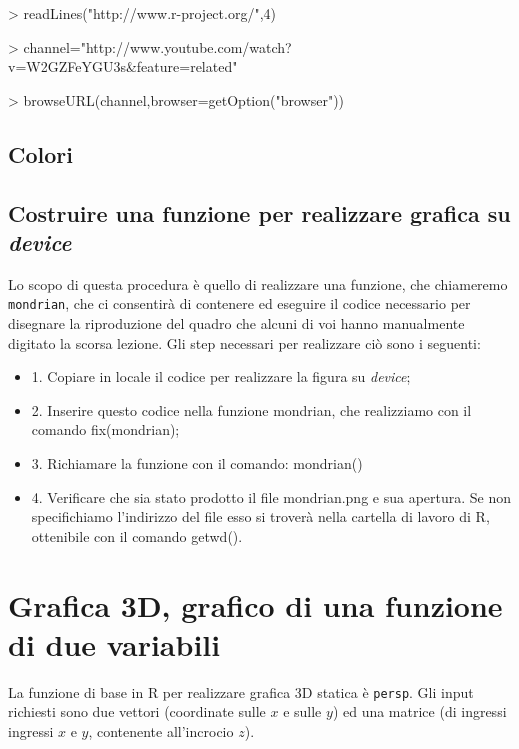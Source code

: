\documentclass[onecolumn,11pt]{book}
\begin{document}
\begin{Schunk}
\begin{Sinput}
> readLines("http://www.r-project.org/",4)
\end{Sinput}
\end{Schunk}
\begin{Schunk}
\begin{Sinput}
> channel="http://www.youtube.com/watch?v=W2GZFeYGU3s&feature=related"
\end{Sinput}
\end{Schunk}
\begin{Schunk}
\begin{Sinput}
> browseURL(channel,browser=getOption("browser"))
\end{Sinput}
\end{Schunk}

\subsection{Colori}

\subsection{Costruire una funzione per realizzare grafica su {\it device}}
Lo scopo di questa procedura \`e quello di  realizzare una funzione, che chiameremo \texttt{mondrian}, che ci consentir\`a di contenere ed eseguire il codice necessario per disegnare la riproduzione  del quadro che alcuni di voi hanno manualmente digitato la scorsa lezione. Gli step necessari
per realizzare ci\`o sono i seguenti:
\begin{itemize}
\item{1.} Copiare in locale il codice per realizzare la figura su \emph{device};
\item{2.} Inserire questo codice nella funzione mondrian, che realizziamo con il comando fix(mondrian);
\item{3.} Richiamare la funzione con il comando: mondrian()
\item{4.} Verificare che sia stato prodotto il file mondrian.png e sua apertura. Se non specifichiamo l'indirizzo del file esso si trover\`a nella cartella di lavoro di \textsf{R}, ottenibile con il comando getwd().
\end{itemize}
\section{Grafica 3D, grafico di una funzione di due variabili}
La funzione di base in \textsf{R} per realizzare grafica 3D statica \`e \texttt{persp}. 
Gli input richiesti sono due vettori (coordinate sulle $x$ e sulle $y$) ed una matrice (di ingressi ingressi $x$ e $y$, contenente
all'incrocio $z$).
\end{document}
